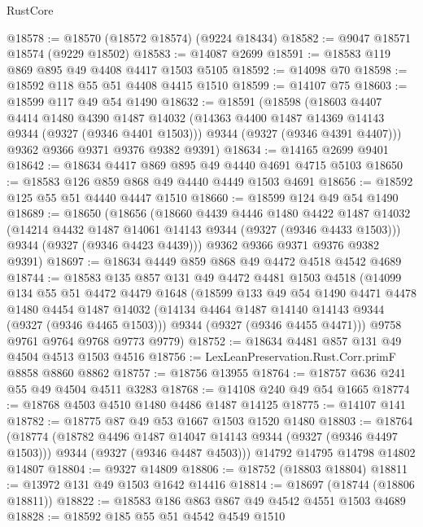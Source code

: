 \begin{lexlean}{RustCore}
\begin{coremodule}
@18578 := @18570 (@18572 @18574) (@9224 @18434)
@18582 := @9047 @18571 @18574 (@9229 @18502)
@18583 := @14087 @2699
@18591 := @18583 @119 @869 @895 @49 @4408 @4417 @1503 @5105
@18592 := @14098 @70
@18598 := @18592 @118 @55 @51 @4408 @4415 @1510
@18599 := @14107 @75
@18603 := @18599 @117 @49 @54 @1490
@18632 := @18591
    (@18598
      (@18603
        @4407
        @4414
        @1480
        @4390
        @1487
        @14032
        (@14363 @4400 @1487 @14369 @14143 @9344 (@9327 (@9346 @4401 @1503)))
        @9344
        (@9327 (@9346 @4391 @4407)))
      @9362
      @9366
      @9371
      @9376
      @9382
      @9391)
@18634 := @14165 @2699 @9401
@18642 := @18634 @4417 @869 @895 @49 @4440 @4691 @4715 @5103
@18650 := @18583 @126 @859 @868 @49 @4440 @4449 @1503 @4691
@18656 := @18592 @125 @55 @51 @4440 @4447 @1510
@18660 := @18599 @124 @49 @54 @1490
@18689 := @18650
    (@18656
      (@18660
        @4439
        @4446
        @1480
        @4422
        @1487
        @14032
        (@14214 @4432 @1487 @14061 @14143 @9344 (@9327 (@9346 @4433 @1503)))
        @9344
        (@9327 (@9346 @4423 @4439)))
      @9362
      @9366
      @9371
      @9376
      @9382
      @9391)
@18697 := @18634 @4449 @859 @868 @49 @4472 @4518 @4542 @4689
@18744 := @18583
    @135
    @857
    @131
    @49
    @4472
    @4481
    @1503
    @4518
    (@14099
      @134
      @55
      @51
      @4472
      @4479
      @1648
      (@18599
        @133
        @49
        @54
        @1490
        @4471
        @4478
        @1480
        @4454
        @1487
        @14032
        (@14134 @4464 @1487 @14140 @14143 @9344 (@9327 (@9346 @4465 @1503)))
        @9344
        (@9327 (@9346 @4455 @4471)))
      @9758
      @9761
      @9764
      @9768
      @9773
      @9779)
@18752 := @18634 @4481 @857 @131 @49 @4504 @4513 @1503 @4516
@18756 := LexLeanPreservation.Rust.Corr.primF @8858 @8860 @8862
@18757 := @18756 @13955
@18764 := @18757 @636 @241 @55 @49 @4504 @4511 @3283
@18768 := @14108 @240 @49 @54 @1665
@18774 := @18768 @4503 @4510 @1480 @4486 @1487 @14125
@18775 := @14107 @141
@18782 := @18775 @87 @49 @53 @1667 @1503 @1520 @1480
@18803 := @18764
    (@18774
      (@18782 @4496 @1487 @14047 @14143 @9344 (@9327 (@9346 @4497 @1503)))
      @9344
      (@9327 (@9346 @4487 @4503)))
    @14792
    @14795
    @14798
    @14802
    @14807
@18804 := @9327 @14809
@18806 := @18752 (@18803 @18804)
@18811 := @13972 @131 @49 @1503 @1642 @14416
@18814 := @18697 (@18744 (@18806 @18811))
@18822 := @18583 @186 @863 @867 @49 @4542 @4551 @1503 @4689
@18828 := @18592 @185 @55 @51 @4542 @4549 @1510

\end{coremodule}
\end{lexlean}
